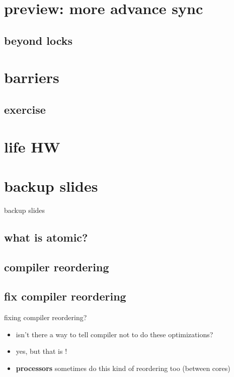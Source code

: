 \section{preview: more advance sync}


\subsection{beyond locks}


\section{barriers}


\subsection{exercise}


\section{life HW}






\section{backup slides}
\begin{frame}{backup slides}
\end{frame}

\subsection{what is atomic?}


\subsection{compiler reordering}


\subsection{fix compiler reordering}
\begin{frame}{fixing compiler reordering?}
    \begin{itemize}
    \item isn't there a way to tell compiler not to do these optimizations?
    \item yes, but that is !
    \item \textbf{processors} sometimes do this kind of reordering too (between cores)
    \end{itemize}
\end{frame}



